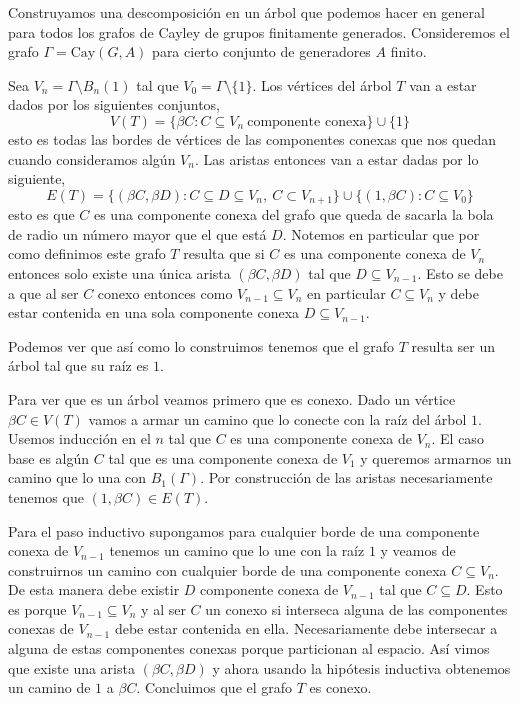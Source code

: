 \documentclass[tesis.tex]{subfiles}
\begin{document}
\begin{ej}\label{desc-grafo-cayley}%
	
	Construyamos una descomposición en un árbol que podemos hacer en general para todos los grafos de Cayley de grupos finitamente generados. 
	Consideremos el grafo $\Gamma = \text{Cay}(G,A)$ para cierto conjunto de generadores $A$ finito.
	
	
	
	Sea $V_n = \Gamma \setminus B_n(1) $ tal que $V_0 = \Gamma \setminus \{1\}$. 
	Los vértices del árbol $T$ van a estar dados por los siguientes conjuntos,
	\[
	V(T) = \{  \beta C : C \subseteq V_n \ \text{componente conexa}   \} \cup \{ 1 \}
	\]
	esto es todas las bordes de vértices de las componentes conexas que nos quedan cuando consideramos algún $V_n$. 
	Las aristas entonces van a estar dadas por lo siguiente,
	\[
	E(T) = \{ (\beta C , \beta D) : C \subseteq D \subseteq V_n, \ C \subset V_{n+1}   \} \cup \{  (1, \beta C) : C \subseteq V_0  \}
	\]
	esto es que $C$ es una componente conexa del grafo que queda de sacarla la bola de radio un número mayor que el que está $D$.
	Notemos en particular que por como definimos este grafo $T$ resulta que si $C$ es una componente conexa de $V_n$ entonces solo existe una única arista $(\beta C, \beta D)$ tal que $D \subseteq V_{n-1}$. 
	Esto se debe a que al ser $C$ conexo entonces como $V_{n-1} \subseteq V_{n}$ en particular $C \subseteq V_{n}$ y debe estar contenida en una sola componente conexa $D \subseteq V_{n-1}.$
	
	
	Podemos ver que así como lo construimos tenemos que el grafo $T$ resulta ser un árbol tal que su raíz es $1$. 
	
	Para ver que es un árbol veamos primero que es conexo. Dado un vértice $\beta C \in V(T)$ vamos a armar un camino que lo conecte con la raíz del árbol $1$. 
	Usemos inducción en el $n$ tal que $C$ es una componente conexa de $V_n$. 
	El caso base es algún $C$ tal que es una componente conexa de $V_1$ y queremos armarnos un camino que lo una con $B_1(\Gamma)$. 
	Por construcción de las aristas necesariamente tenemos que $(1, \beta C) \in E(T)$.
		
	Para el paso inductivo supongamos para cualquier borde de una componente conexa de $V_{n-1}$ tenemos un camino que lo une con la raíz $1$ y veamos de construirnos un camino con cualquier borde de una componente conexa $C \subseteq V_n$.
	De esta manera debe existir $D$ componente conexa de $V_{n-1}$ tal que $C \subseteq D$. Esto es porque $V_{n-1} \subseteq V_{n}$ y al ser $C$ un conexo si interseca alguna de las componentes conexas de $V_{n-1}$ debe estar contenida en ella. 
	Necesariamente debe intersecar a alguna de estas componentes conexas porque particionan al espacio.
	Así vimos que existe una arista $(\beta C, \beta D)$ y ahora usando la hipótesis inductiva obtenemos un camino de $1$ a $\beta C$.
	Concluimos que el grafo $T$ es conexo.   
	

\end{ej}
\end{document}
